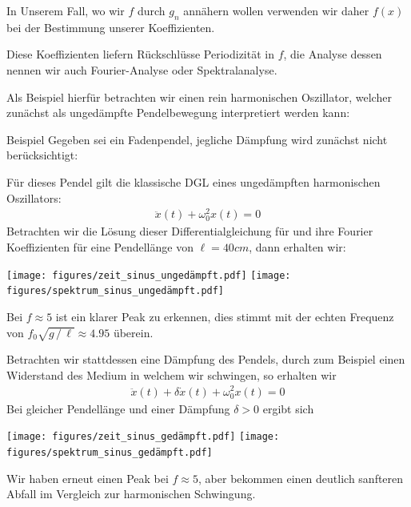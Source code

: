 In Unserem Fall, wo wir $f$ durch $g_n$ annähern wollen verwenden wir daher $f(x)$ bei der Bestimmung unserer 
Koeffizienten.

Diese Koeffizienten liefern Rückschlüsse Periodizität in $f$, die Analyse dessen nennen wir auch Fourier-Analyse 
oder Spektralanalyse. 

Als Beispiel hierfür betrachten wir einen rein harmonischen Oszillator, welcher zunächst als ungedämpfte Pendelbewegung 
interpretiert werden kann:

\begin{colboxBreakable}{Beispiel}
  Gegeben sei ein Fadenpendel, jegliche Dämpfung wird zunächst nicht berücksichtigt:
  \begin{center}
    
  \end{center}
  Für dieses Pendel gilt die klassische DGL eines ungedämpften harmonischen Oszillators:
    \begin{align*}
      \ddot{x}(t) + \omega_0^2 x(t) = 0
      \tag{1}\label{eq:PendelDGL1}
    \end{align*}
  Betrachten wir die Lösung dieser Differentialgleichung für und ihre Fourier Koeffizienten für eine Pendellänge von
  $\ell=40cm$, dann erhalten wir:
  
  \begin{center}
    \texttt{[image: figures/zeit\_sinus\_ungedämpft.pdf]}
    \hfill
    \texttt{[image: figures/spektrum\_sinus\_ungedämpft.pdf]}
  \end{center}

  Bei $f\approx 5$ ist ein klarer Peak zu erkennen, dies stimmt mit der echten Frequenz von 
  $f_0\sqrt{g\,/\,\ell}\approx 4.95$ überein.

  Betrachten wir stattdessen eine Dämpfung des Pendels, durch zum Beispiel einen Widerstand des Medium in welchem wir 
  schwingen, so erhalten wir 
    \begin{align*}
      \ddot{x}(t) + \delta\dot{x}(t)+ \omega_0^2 x(t) = 0
      \tag{2}\label{eq:PendelDGL2}
    \end{align*}
    Bei gleicher Pendellänge und einer Dämpfung $\delta>0$ ergibt sich 

    \begin{center}
      \texttt{[image: figures/zeit\_sinus\_gedämpft.pdf]}
      \hfill
      \texttt{[image: figures/spektrum\_sinus\_gedämpft.pdf]}
    \end{center}

    Wir haben erneut einen Peak bei $f\approx 5$, aber bekommen einen deutlich sanfteren Abfall im Vergleich zur
    harmonischen Schwingung.
\end{colboxBreakable}

